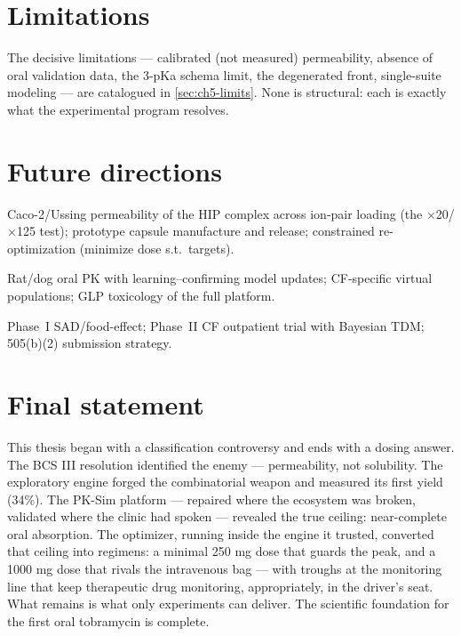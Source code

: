\section{Limitations}
The decisive limitations --- calibrated (not measured) permeability, absence of oral validation data, the 3-pKa schema limit, the degenerated front, single-suite modeling --- are catalogued in \cref{sec:ch5-limits}. None is structural: each is exactly what the experimental program resolves.

\section{Future directions}
\begin{description}[labelwidth=4.2cm, style=nextline]
\item[Immediate (0--6 months)] Caco-2/Ussing permeability of the HIP complex across ion-pair loading (the $\times$20/$\times$125 test); prototype capsule manufacture and release; constrained re-optimization (minimize dose s.t.\ targets).
\item[Short term (6--12 months)] Rat/dog oral PK with learning--confirming model updates; CF-specific virtual populations; GLP toxicology of the full platform.
\item[Long term (1--3 years)] Phase~I SAD/food-effect; Phase~II CF outpatient trial with Bayesian TDM; 505(b)(2) submission strategy.
\end{description}

\section{Final statement}
This thesis began with a classification controversy and ends with a dosing answer. The BCS III resolution identified the enemy --- permeability, not solubility. The exploratory engine forged the combinatorial weapon and measured its first yield (34\%). The PK-Sim platform --- repaired where the ecosystem was broken, validated where the clinic had spoken --- revealed the true ceiling: near-complete oral absorption. The optimizer, running inside the engine it trusted, converted that ceiling into regimens: a minimal 250 mg dose that guards the peak, and a 1000 mg dose that rivals the intravenous bag --- with troughs at the monitoring line that keep therapeutic drug monitoring, appropriately, in the driver's seat. What remains is what only experiments can deliver. The scientific foundation for the first oral tobramycin is complete.
